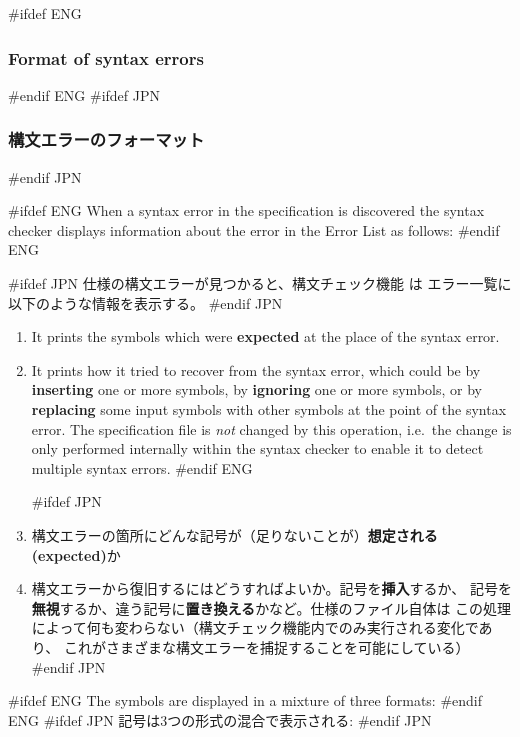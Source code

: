 \documentclass[\pformat,12pt]{article}
\newcommand{\guicmd}[1]{{\sf #1}}
\newcommand{\guicmd}[1]{{\gt #1}}
\begin{document}
#ifdef ENG
\subsubsection{Format of syntax errors} \label{subsub:synerr}
#endif ENG
#ifdef JPN
\subsubsection{構文エラーのフォーマット} \label{subsub:synerr}
#endif JPN

#ifdef ENG
When a syntax error in the specification is discovered the syntax
checker displays information about the
error in the \guicmd{Error List} as follows:
#endif ENG

#ifdef JPN
仕様の構文エラーが見つかると、構文チェック機能 は
\guicmd{エラー一覧}に以下のような情報を表示する。
#endif JPN

\begin{enumerate}

#ifdef ENG
\item It prints the symbols which were \textbf{expected} at the place
  of the syntax error.

\item It prints how it tried to recover from the syntax error, which
  could be by \textbf{inserting} one or more symbols, by
  \textbf{ignoring} one or more symbols, or by \textbf{replacing} 
  some input symbols with other symbols at the point of the syntax
  error. The specification file is {\em not\/} changed by this
  operation, i.e.\ the change is only performed internally within the
  syntax checker to enable it to detect multiple syntax errors.
#endif ENG

#ifdef JPN
\item
 構文エラーの箇所にどんな記号が（足りないことが）\textbf{想定される(expected)}か

\item
  構文エラーから復旧するにはどうすればよいか。記号を\textbf{挿入}するか、
  記号を\textbf{無視}するか、違う記号に\textbf{置き換える}かなど。仕様のファイル自体は
  この処理によって何も変わらない（構文チェック機能内でのみ実行される変化であり、
  これがさまざまな構文エラーを捕捉することを可能にしている）
#endif JPN

\end{enumerate}

#ifdef ENG
The symbols are displayed in a mixture of three formats:
#endif ENG
#ifdef JPN
記号は3つの形式の混合で表示される:
#endif JPN
\end{document}
